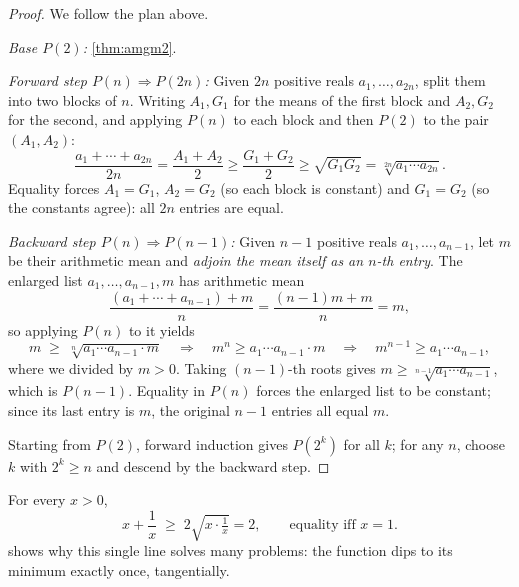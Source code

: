 \begin{proof}
We follow the plan above.

\emph{Base $P(2)$:} \cref{thm:amgm2}.

\emph{Forward step $P(n) \Rightarrow P(2n)$:} Given $2n$ positive
reals $a_1, \dots, a_{2n}$, split them into two blocks of $n$. Writing
$A_1, G_1$ for the means of the first block and $A_2, G_2$ for the
second, and applying $P(n)$ to each block and then $P(2)$ to the pair
$(A_1, A_2)$:
\[
  \frac{a_1 + \cdots + a_{2n}}{2n}
  = \frac{A_1 + A_2}{2}
  \ge \frac{G_1 + G_2}{2}
  \ge \sqrt{G_1 G_2}
  = \sqrt[2n]{a_1 \cdots a_{2n}} .
\]
Equality forces $A_1 = G_1$, $A_2 = G_2$ (so each block is constant)
and $G_1 = G_2$ (so the constants agree): all $2n$ entries are equal.

\emph{Backward step $P(n) \Rightarrow P(n-1)$:} Given $n - 1$
positive reals $a_1, \dots, a_{n-1}$, let $m$ be their arithmetic
mean and \emph{adjoin the mean itself as an $n$-th entry}. The
enlarged list $a_1, \dots, a_{n-1}, m$ has arithmetic mean
\[
  \frac{(a_1 + \cdots + a_{n-1}) + m}{n}
  = \frac{(n-1)m + m}{n} = m,
\]
so applying $P(n)$ to it yields
\[
  m \;\ge\; \sqrt[n]{a_1 \cdots a_{n-1} \cdot m}
  \quad\Longrightarrow\quad
  m^n \ge a_1 \cdots a_{n-1} \cdot m
  \quad\Longrightarrow\quad
  m^{n-1} \ge a_1 \cdots a_{n-1},
\]
where we divided by $m > 0$. Taking $(n-1)$-th roots gives $m \ge
\sqrt[n-1]{a_1 \cdots a_{n-1}}$, which is $P(n-1)$. Equality in
$P(n)$ forces the enlarged list to be constant; since its last entry
is $m$, the original $n-1$ entries all equal $m$.

Starting from $P(2)$, forward induction gives $P(2^k)$ for all $k$;
for any $n$, choose $k$ with $2^k \ge n$ and descend by the backward
step. \end{proof}

\begin{example}\label{ex:reciprocal}
For every $x > 0$,
\[
  x + \frac{1}{x} \;\ge\; 2\sqrt{x \cdot \tfrac{1}{x}} = 2,
  \qquad\text{equality iff } x = 1 .
\]
 shows why this single line solves many
problems: the function dips to its minimum exactly once, tangentially.
\end{example}

